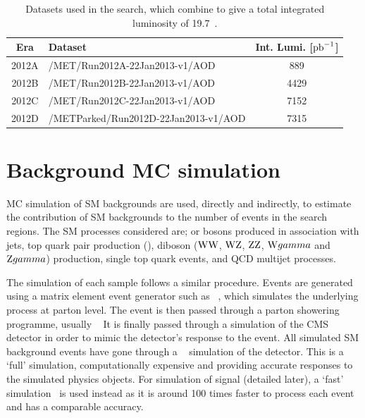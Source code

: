 \begin{table} %
    \begin{center}
    \caption{Datasets used in the search, which combine to give a total integrated luminosity of 19.7~\fbinv.}
     \begin{tabular}{clc}\hline
Era    &       Dataset  &  Int. Lumi. [$\mathrm{pb}^{-1}$]\\ \hline
2012A & /MET/Run2012A-22Jan2013-v1/AOD & 889 \\
2012B & /MET/Run2012B-22Jan2013-v1/AOD & 4429 \\
2012C & /MET/Run2012C-22Jan2013-v1/AOD & 7152 \\
2012D & /METParked/Run2012D-22Jan2013-v1/AOD & 7315 \\ \hline
                \end{tabular}
                    \label{tab:dataSets}
\end{center}
\end{table}




%
\section{Background MC simulation} 
\label{sec:GEN}
\ac{MC} simulation of \ac{SM} backgrounds are used, directly and indirectly, to estimate the contribution of \ac{SM} backgrounds to the number of events in the search regions. 
The \ac{SM} processes considered are;  \W or \Z bosons produced in association with jets, top quark pair production (\ttbar), diboson ($\mathrm{W}\mathrm{W}{}$, $\mathrm{W}\mathrm{Z}{}$, $\mathrm{Z}\mathrm{Z}{}$, $\mathrm{W}gamma{}$ and $\mathrm{Z}gamma${}) production, single top quark events, and QCD multijet processes.

The simulation of each sample follows a similar procedure.
Events are generated using a matrix element event generator such as \MADGRAPH{}~\cite{madgraph,madgraph2}, which simulates the underlying process at parton level. 
The event is then passed through a parton showering programme, usually \PYTHIA{}~\cite{pythia,pythia8} 
It is finally passed through a simulation of the CMS detector in order to mimic the detector's response to the event.
All simulated \ac{SM} background events have gone through a \GEANTfour~\cite{Geant4-1,Geant4-2} simulation of the detector. 
This is a `full' simulation, computationally expensive and providing accurate responses to the simulated physics objects.  
For simulation of signal (detailed later), a `fast' simulation~\cite{FASTSIM} is used instead as it is around 100 times faster to process each event and has a comparable accuracy.

